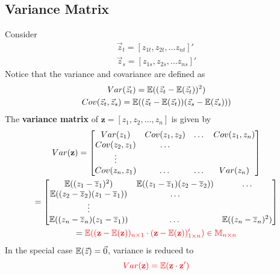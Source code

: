 \documentclass[]{article}
\begin{document}
    		\subsection{Variance Matrix}
    			\par Consider 
    			\begin{gather*}
    				\vec{z}_t = [z_{1t}, z_{2t}, \dots z_{nt}]' \\
    				\vec{z}_s = [z_{1s}, z_{2s}, \dots z_{ns}]'
    			\end{gather*}
    			Notice that the variance and covariance are defined as
    			\begin{gather*}
    				Var(\vec{z}_t) = \mathbb{E}({(\vec{z}_t - \mathbb{E}({\vec{z}_t}))^2}) \\
    				Cov(\vec{z}_t, \vec{z}_s) = \mathbb{E}({(\vec{z}_t - \mathbb{E}({\vec{z}_t}))(\vec{z}_s - \mathbb{E}({\vec{z}_s}))})
    			\end{gather*}
    			The \textbf{variance matrix} of $\textbf{z} = [z_1, z_2, \dots, z_n]$ is given by
    			\begin{gather*}
    				Var(\textbf{z}) = \begin{bmatrix}
    					Var(z_1) & Cov(z_1, z_2) & \dots & Cov(z_1, z_n) \\
    					Cov(z_2, z_1) & \dots \\
    					\vdots \\
    					Cov(z_n, z_1) & \dots & \dots & Var(z_n) \\
    				\end{bmatrix} \\
    				= 
    				\begin{bmatrix}
    					\mathbb{E}({(z_1 - \overline{z}_1)^2}) & \mathbb{E}({(z_1 - \overline{z}_1)(z_2 - \overline{z}_2)}) & \dots \\
    					\mathbb{E}({(z_2 - \overline{z}_2)(z_1 - \overline{z}_1)}) & \dots \\
    					\vdots \\
    					\mathbb{E}({(z_n - \overline{z}_n)(z_1 - \overline{z}_1)}) & \dots & \mathbb{E}({(z_n - \overline{z}_n)^2}) \\
    				\end{bmatrix} \\
    				= \textcolor{red}{
    				\mathbb{E}({(\textbf{z} - \mathbb{E}({\textbf{z}}))_{n \times 1} \cdot (\textbf{z} - \mathbb{E}({\textbf{z}}))'_{1 \times n}}) \in \mathbb{M}_{n \times n}
    				}
    			\end{gather*}
    			In the special case $\mathbb{E}({\vec{z}}) = \vec{0}$, variance is reduced to
    			\[
    				\textcolor{red}{
    					Var(\textbf{z}) = \mathbb{E}({\textbf{z} \cdot \textbf{z}'})
    				}
    			\]
\end{document}
